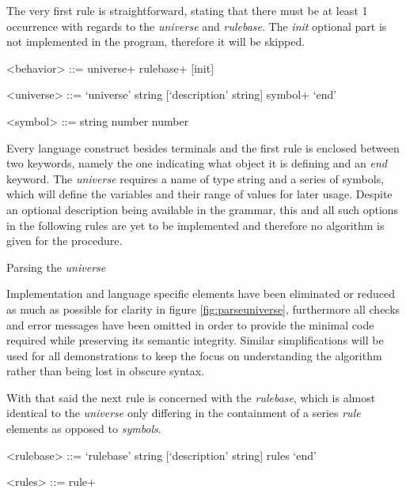 The very first rule is straightforward, stating that there must be at least 1 occurrence with regards to the \textit{universe} and \textit{rulebase}. The \textit{init} optional part is not implemented in the program, therefore it will be skipped.
\begin{grammar}
<behavior> ::= universe+ rulebase+ [init]

<universe> ::= `universe' string [`description' string] symbol+ `end'

<symbol> ::= string number number
\end{grammar}

Every language construct besides terminals and the first rule is enclosed between two keywords, namely the one indicating what object it is defining and an \textit{end} keyword. The \textit{universe} requires a name of type string and a series of symbols, which will define the variables and their range of values for later usage. Despite an optional description being available in the grammar, this and all such options in the following rules are yet to be implemented and therefore no algorithm is given for the procedure.

\vskip 0.5cm
\begin{algorithm}[H]
\caption{Parsing the \textit{universe}}
\label{fig:parseuniverse}
\end{algorithm}
\vskip 0.5cm

Implementation and language specific elements have been eliminated or reduced as much as possible for clarity in figure \ref{fig:parseuniverse}, furthermore all checks and error messages have been omitted in order to provide the minimal code required while preserving its semantic integrity. Similar simplifications will be used for all demonstrations to keep the focus on understanding the algorithm rather than being lost in obscure syntax.

With that said the next rule is concerned with the \textit{rulebase}, which is almost identical to the \textit{universe} only differing in the containment of a series \textit{rule} elements as opposed to \textit{symbols}.
\begin{grammar}
<rulebase> ::= `rulebase' string [`description' string] rules `end'

<rules> ::= rule+
\end{grammar}


